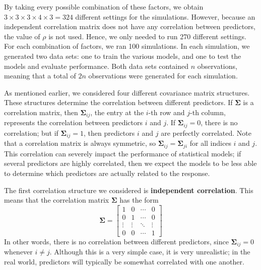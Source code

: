 \documentclass{article}
\begin{document}
By taking every possible combination of these factors, we obtain $3\times 3\times 3\times 4\times 3 = 324$ different settings for the simulations. However, because an independent correlation matrix does not have any correlation between predictors, the value of $\rho$ is not used. Hence, we only needed to run 270 different settings. For each combination of factors, we ran 100 simulations. In each simulation, we generated two data sets: one to train the various models, and one to test the models and evaluate performance. Both data sets contained $n$ observations, meaning that a total of $2n$ observations were generated for each simulation.

As mentioned earlier, we considered four different covariance matrix structures. These structures determine the correlation between different predictors. If $\mathbf{\Sigma}$ is a correlation matrix, then $\mathbf{\Sigma}_{ij}$, the entry at the $i$-th row and $j$-th column, represents the correlation between predictors $i$ and $j$. If $\mathbf{\Sigma}_{ij}=0$, there is no correlation; but if $\mathbf{\Sigma}_{ij}=1$, then predictors $i$ and $j$ are perfectly correlated. Note that a correlation matrix is always symmetric, so $\mathbf{\Sigma}_{ij} = \mathbf{\Sigma}_{ji}$ for all indices $i$ and $j$. This correlation can severely impact the performance of statistical models; if several predictors are highly correlated, then we expect the models to be less able to determine which predictors are actually related to the response.

The first correlation structure we considered is \textbf{independent correlation}. This means that the correlation matrix $\mathbf{\Sigma}$ has the form
\begin{equation}
	\mathbf{\Sigma} = \begin{bmatrix}
		1 & 0 & \cdots & 0 \\
		0 & 1 & \cdots & 0 \\
		\vdots & \vdots & \ddots & \vdots \\
		0 & 0 & \cdots & 1
	\end{bmatrix}
\end{equation}
In other words, there is no correlation between different predictors, since $\mathbf{\Sigma}_{ij} = 0$ whenever $i\neq j$. Although this is a very simple case, it is very unrealistic; in the real world, predictors will typically be somewhat correlated with one another.
\end{document}
